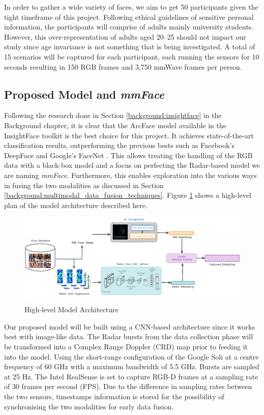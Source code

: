 \documentclass{interim}
\begin{document}
In order to gather a wide variety of faces, we aim to get 50 participants given the tight timeframe of this project. Following ethical guidelines of sensitive personal information, the participants will comprise of adults mainly university students. However, this over-representation of adults aged 20--25 should not impact our study since age invariance is not something that is being investigated. A total of 15 scenarios will be captured for each participant, each running the sensors for 10 seconds resulting in 150 RGB frames and 3,750 mmWave frames per person.


\subsection{Proposed Model and \textit{mmFace}}
Following the research done in Section \ref{background:insightface} in the Background chapter, it is clear that the ArcFace model available in the InsightFace toolkit is the best choice for this project. It achieves state-of-the-art classification results, outperforming the previous bests such as Facebook's DeepFace \cite{taigman2014deepface} and Google's FaceNet \cite{schroff2015facenet}. This allows treating the handling of the RGB data with a black-box model and a focus on perfecting the Radar-based model we are naming \textit{mmFace}. Furthermore, this enables exploration into the various ways in fusing the two modalities as discussed in Section \ref{background:multimodal_data_fusion_techniques}. Figure \ref{fig:model_architecture} shows a high-level plan of the model architecture described here.

\begin{figure}[h!]
    \centering
    \includegraphics[width=1\textwidth]{images/model_architecture.png}
    \caption{High-level Model Architecture}
    \label{fig:model_architecture}
\end{figure}

Our proposed model will be built using a CNN-based architecture since it works best with image-like data. The Radar bursts from the data collection phase will be transformed into a Complex Range Doppler (CRD) map \cite{lien2016soli, hayashi2021radarnet} prior to feeding it into the model. Using the short-range configuration of the Google Soli at a centre frequency of 60 GHz with a maximum bandwidth of 5.5 GHz. Bursts are sampled at 25 Hz. The Intel RealSense is set to capture RGB-D frames at a sampling rate of 30 frames per second (FPS). Due to the difference in sampling rates between the two sensors, timestamps information is stored for the possibility of synchronising the two modalities for early data fusion.
\end{document}
